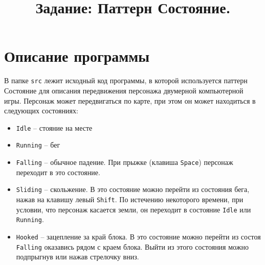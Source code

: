 \documentclass{article}
\begin{document}


\title{Задание: Паттерн Состояние. \vspace{-5ex}}\date{}\maketitle

\section*{Описание программы}
В папке \texttt{src} лежит исходный код программы, в которой используется паттерн Состояние для описания передвижения персонажа двумерной компьютерной игры. Персонаж может передвигаться по карте, при этом он может находиться в следующих состояниях:
\begin{itemize}
\item \texttt{Idle} -- стояние на месте
\item \texttt{Running} -- бег
\item \texttt{Falling} -- обычное падение. При прыжке (клавиша \texttt{Space}) персонаж переходит в это состояние.
\item \texttt{Sliding} -- скольжение. В это состояние можно перейти из состояния бега, нажав на клавишу левый \texttt{Shift}. По истечению некоторого времени, при условии, что персонаж касается земли, он переходит в состояние \texttt{Idle} или \texttt{Running}.
\item \texttt{Hooked} -- зацепление за край блока. В это состояние можно перейти из состоя \texttt{Falling} оказавись рядом с краем блока. Выйти из этого состояния можно подпрыгнув или нажав стрелочку вниз.
\end{itemize}
\end{document}
